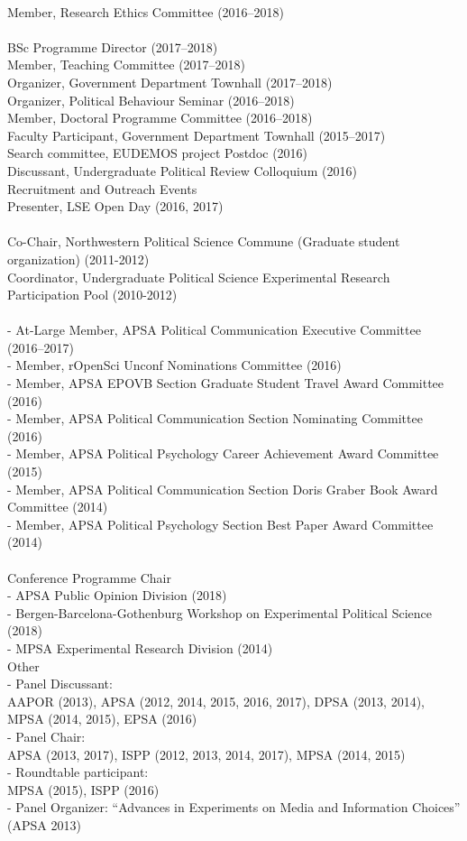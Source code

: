 \documentclass[12pt]{article}
\renewcommand{\section}[1]{\pagebreak[3]%
    \llap{\scshape\smash{\parbox[t]{\marginparwidth}{\raggedright {\color{lg}#1}}}}%
    \vspace{-\baselineskip}\par}
\newcommand{\topic}[1]{\pagebreak[3]\indent {\color{lg}{\footnotesize #1 }}\\}
\newcommand{\entry}[1]{\indent {\color{lg}\guillemotright}\hspace{2pt}#1\vspace{.25em}\\}
\newcommand{\subentry}[1]{{\color{lg}-} #1\vspace{.25em}\\}
\begin{document}
\section{Institutional\\ \& Professional Service}
\topic{Institutional (London School of Economics and Political Science)}
	\entry{Member, Research Ethics Committee (2016--2018)}
	
\topic{Departmental (London School of Economics and Political Science)}
	\entry{BSc Programme Director (2017--2018)}
    \entry{Member, Teaching Committee (2017--2018)}
    \entry{Organizer, Government Department Townhall (2017--2018)}
    \entry{Organizer, Political Behaviour Seminar (2016--2018)}
	\entry{Member, Doctoral Programme Committee (2016--2018)}
    \entry{Faculty Participant, Government Department Townhall (2015--2017)}
	\entry{Search committee, EUDEMOS project Postdoc (2016)}
	\entry{Discussant, Undergraduate Political Review Colloquium (2016)}
    \entry{Recruitment and Outreach Events}
        \entry{Presenter, LSE Open Day (2016, 2017)}

\topic{Departmental (Northwestern University)}
	\entry{Co-Chair, Northwestern Political Science Commune (Graduate student organization) (2011-2012)}
	\entry{Coordinator, Undergraduate Political Science Experimental Research Participation Pool (2010-2012)}

\topic{Disciplinary Committees}
		\subentry{At-Large Member, APSA Political Communication Executive Committee (2016--2017)}
		\subentry{Member, rOpenSci Unconf Nominations Committee (2016)}
		\subentry{Member, APSA EPOVB Section Graduate Student Travel Award Committee (2016)}
		\subentry{Member, APSA Political Communication Section Nominating Committee (2016)}
		\subentry{Member, APSA Political Psychology Career Achievement Award Committee (2015)}
		\subentry{Member, APSA Political Communication Section Doris Graber Book Award Committee (2014)}
		\subentry{Member, APSA Political Psychology Section Best Paper Award Committee (2014)}

\topic{Service at Professional Conferences}
    \entry{Conference Programme Chair}
        \subentry{APSA Public Opinion Division (2018)}
        \subentry{Bergen-Barcelona-Gothenburg Workshop on Experimental Political Science (2018)}
        \subentry{MPSA Experimental Research Division (2014)}
	\entry{Other}
        \subentry{Panel Discussant:\\ AAPOR (2013), APSA (2012, 2014, 2015, 2016, 2017), DPSA (2013, 2014), MPSA (2014, 2015), EPSA (2016)}
		\subentry{Panel Chair:\\ APSA (2013, 2017), ISPP (2012, 2013, 2014, 2017), MPSA (2014, 2015)}
		\subentry{Roundtable participant:\\ MPSA (2015), ISPP (2016)}
		\subentry{Panel Organizer: ``Advances in Experiments on Media and Information Choices'' (APSA 2013)}
\end{document}
